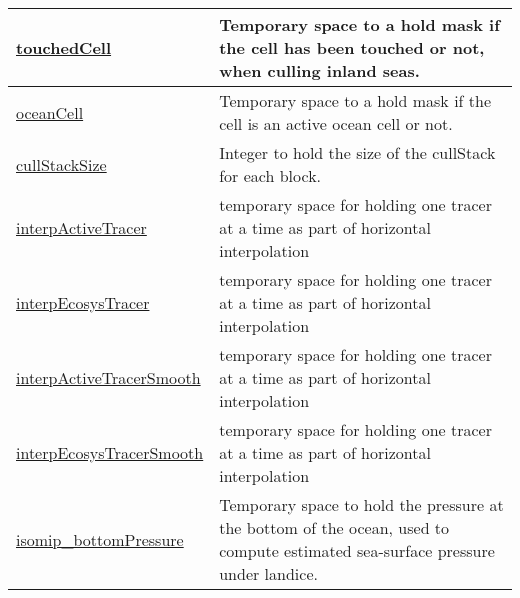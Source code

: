 {\begin{center}
\begin{longtable}{| p{2.0in} | p{4.0in} |}
    \hline
    \hyperref[subsec:var_sec_scratch_touchedCell]{touchedCell} & Temporary space to a hold mask if the cell has been touched or not, when culling inland seas. \\
    \hline
    \hyperref[subsec:var_sec_scratch_oceanCell]{oceanCell} & Temporary space to a hold mask if the cell is an active ocean cell or not. \\
    \hline
    \hyperref[subsec:var_sec_scratch_cullStackSize]{cullStackSize} & Integer to hold the size of the cullStack for each block. \\
    \hline
    \hyperref[subsec:var_sec_scratch_interpActiveTracer]{interpActiveTracer} & temporary space for holding one tracer at a time as part of horizontal interpolation \\
    \hline
    \hyperref[subsec:var_sec_scratch_interpEcosysTracer]{interpEcosysTracer} & temporary space for holding one tracer at a time as part of horizontal interpolation \\
    \hline
    \hyperref[subsec:var_sec_scratch_interpActiveTracerSmooth]{interpActiveTracerSmooth} & temporary space for holding one tracer at a time as part of horizontal interpolation \\
    \hline
    \hyperref[subsec:var_sec_scratch_interpEcosysTracerSmooth]{interpEcosysTracerSmooth} & temporary space for holding one tracer at a time as part of horizontal interpolation \\
    \hline
    \hyperref[subsec:var_sec_scratch_isomip_bottomPressure]{isomip\_bottomPressure} & Temporary space to hold the pressure at the bottom of the ocean, used to compute estimated sea-surface pressure under landice. \\
    \hline
\end{longtable}
\end{center}
}
